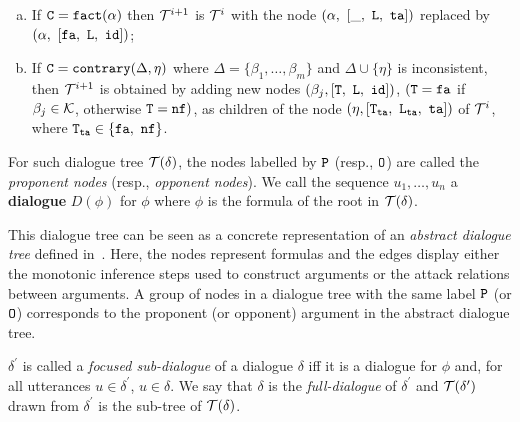 \begin{definition}
\begin{enumerate}
\begin{enumerate} [a)]
   
         \item If $\texttt{\textup{C}} = \texttt{\textup{fact}}(\alpha)$ then $\mathcal{T}^{i+1}$  is $\mathcal{T}^i$ with the node $(\alpha,\ [\_,\ \texttt{\textup{L}},\ \texttt{\textup{ta}}])$ replaced by $(\alpha,\ [\texttt{\textup{fa}},\ \texttt{\textup{L}},\ \texttt{\textup{id}}])$;

         \item        
         If $\texttt{\textup{C}} = \texttt{\textup{contrary}}(\Delta, \eta)$ where $\Delta = \{\beta_1, \ldots, \beta_m \}$ and $\Delta \cup \{\eta \}$ is inconsistent, then $\mathcal{T}^{i+1}$ is obtained by adding
         new nodes $(\beta_j, [\texttt{\textup{T}} ,\ \texttt{\textup{L}} ,\ \texttt{\textup{id}}])$, $(\texttt{\textup{T}} = \texttt{\textup{fa}}$ if $\beta_j \in \mathcal{K}$, otherwise $\texttt{\textup{T}} = \texttt{\textup{nf}} )$, as children of the node $(\eta, [\texttt{\textup{T}}_{\texttt{\textup{ta}}} ,\ \texttt{\textup{L}}_{\texttt{\textup{ta}}},\ \texttt{\textup{ta}}])$ of $\mathcal{T}^i$, where $\texttt{\textup{T}}_{\texttt{\textup{ta}}} \in \{ \texttt{\textup{fa}},\ \texttt{\textup{nf}} \}$.
         
     \end{enumerate}
 \end{enumerate}


 For such dialogue tree $\mathcal{T}(\delta)$, the nodes labelled by $\texttt{\textup{P}}$ (resp., $\texttt{\textup{O}}$) are called the \emph{proponent nodes} (resp., \emph{opponent nodes}).
%
 We call the sequence $u_1, \ldots, u_n$ a \textbf{dialogue} $D(\phi)$ for $\phi$ where $\phi$ is the formula of the root in $\mathcal{T}(\delta)$.
 \end{definition}



 This dialogue tree can be seen as a concrete representation of an \emph{abstract dialogue tree} defined in~\cite{loanho_2024}. 
 Here, the nodes represent formulas and the edges display either the monotonic inference steps used to construct arguments or the attack relations between arguments. A group of nodes in a dialogue tree with the same label $\texttt{\textup{P}}$ (or $\texttt{\textup{O}}$) corresponds to the proponent (or opponent) argument in the abstract dialogue tree.
 
 

\begin{definition} 
\label{def:focused-sub-dia}
$\delta^{\prime}$ is called a \emph{focused sub-dialogue} of a dialogue $\delta$  iff it is a dialogue for $\phi$ and, for all utterances $u \in \delta^{\prime}$, $u \in \delta$. We say that $\delta$ is the \emph{full-dialogue} of $\delta^{\prime}$ and $\mathcal{T}(\delta^{\prime})$ drawn from $\delta^{\prime}$  is the sub-tree of $\mathcal{T}(\delta)$.
 
\end{definition}

